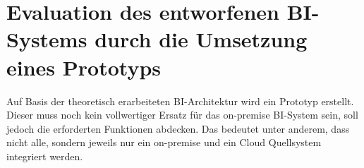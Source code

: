 \chapter{Evaluation des entworfenen BI-Systems durch die Umsetzung eines Prototyps} \label{ch:praktischeUmsetzung}
Auf Basis der theoretisch erarbeiteten BI-Architektur wird ein Prototyp erstellt. Dieser muss noch kein vollwertiger Ersatz für das on-premise BI-System sein, soll jedoch die erforderten Funktionen abdecken. Das bedeutet unter anderem, dass nicht alle, sondern jeweils nur ein on-premise und ein Cloud Quellsystem integriert werden.




